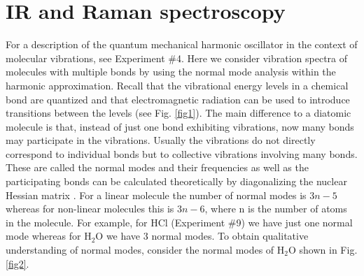 \documentclass[byrevtex,amssymb,aps,pra,floatfix,letterpaper]{revtex4}
\begin{document}
\section{IR and Raman spectroscopy}

For a description of the quantum mechanical harmonic oscillator in the context of molecular vibrations, see Experiment \#4. Here we consider vibration spectra of molecules with multiple bonds by using the normal mode analysis within the harmonic approximation. Recall that the vibrational energy levels in a chemical bond are quantized and that electromagnetic radiation can be used to introduce transitions between the levels (see Fig. \ref{fig1}). The main difference to a diatomic molecule is that, instead of just one bond exhibiting vibrations, now many bonds may participate in the vibrations. Usually the vibrations do not directly correspond to individual bonds but to collective vibrations involving many bonds. These are called the normal modes and their frequencies as well as the participating bonds can be calculated theoretically by diagonalizing the nuclear Hessian matrix \cite{ATKINS2}. For a linear molecule the number of normal modes is $3n - 5$ whereas for non-linear molecules this is $3n - 6$, where n is the number of atoms in the molecule. For example, for HCl (Experiment \#9) we have just one normal mode whereas for H$_2$O we have 3 normal modes. To obtain qualitative understanding of normal modes, consider the normal modes of 
H$_2$O shown in Fig. \ref{fig2}.
\end{document}
